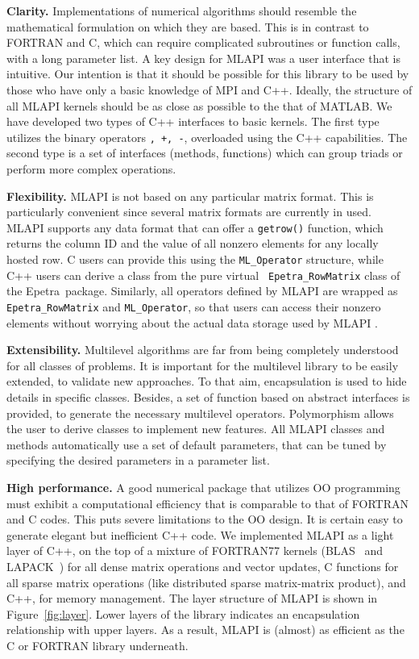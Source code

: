 \documentclass{article}[11pt]
\newcommand{\epetra}  {{\sc Epetra}}
\newcommand{\MLAPI}  {{\sc MLAPI }}
\begin{document}
\noindent
{\bf Clarity.} Implementations of numerical algorithms should resemble
the mathematical formulation on which they are based. This is in contrast to
FORTRAN and C, which can require complicated subroutines or function calls,
  with a long parameter list.
A key design for \MLAPI was a user interface that is
intuitive. Our intention is that it should be possible for this
library to be used by those who have only a basic knowledge of MPI and C++.
Ideally, the structure of all \MLAPI kernels should be as close as possible to
the that of MATLAB. We have developed two types of C++ interfaces to basic
kernels. The first type utilizes the binary operators {\tt *, +, -},
  overloaded using the C++ capabilities. The second type is a set of
  interfaces (methods, functions) which can group triads or perform more
  complex operations.

\bigskip

\noindent
{\bf Flexibility.} \MLAPI is not based on any particular matrix format. This
is particularly convenient since several matrix formats are currently in used.
\MLAPI supports any data format that can offer a {\tt getrow()} function,
  which returns the column ID and the value of all nonzero elements for any
  locally hosted row. C users can provide this using the {\tt ML\_Operator}
  structure, while C++ users can derive a class from the pure virtual {\tt
    Epetra\_RowMatrix} class of the \epetra\ package.  Similarly, all operators defined by \MLAPI are
    wrapped as {\tt Epetra\_RowMatrix} and {\tt ML\_Operator}, so that users
    can access their nonzero elements without worrying about the actual data
    storage used by \MLAPI.
\bigskip

\noindent
{\bf Extensibility.} Multilevel algorithms are far from being completely
understood for all classes of problems. It is important for the multilevel
library to be easily extended, to validate new approaches. To that aim,
encapsulation is used to hide details in
specific classes. Besides, a set of function based on abstract interfaces
is provided, to generate the necessary multilevel operators. Polymorphism
allows the user to derive classes to implement new features.
All \MLAPI classes and methods automatically use a set of
default parameters, that can be tuned by specifying the
desired parameters in a parameter list.

\bigskip

\noindent
{\bf High performance.} A good numerical package that utilizes OO programming
must exhibit a computational efficiency that is comparable to that of FORTRAN
and C codes. This puts severe limitations to the OO design. It is certain easy
to generate elegant but inefficient C++ code.  We implemented \MLAPI as a
light layer of C++, on the top of
a mixture of FORTRAN77 kernels (BLAS~\cite{dongarra90set} and
                                LAPACK~\cite{demmel89lapack}) 
for all dense matrix
operations and vector updates, C functions for all sparse matrix operations
(like distributed sparse matrix-matrix product), and C++, for memory
management. The layer
structure of \MLAPI is shown in Figure~\ref{fig:layer}. Lower layers of the
library indicates an encapsulation relationship with upper layers. As a
result, \MLAPI is (almost) as
efficient as the C or FORTRAN library underneath.
\end{document}

